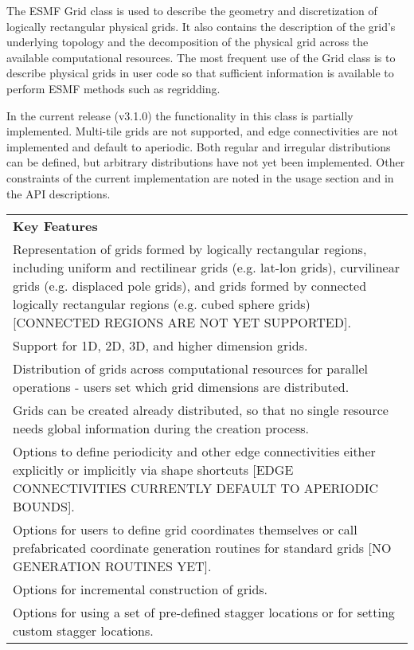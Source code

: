 %

The ESMF Grid class is used to describe the geometry and discretization
of logically rectangular physical grids.  It also contains the
description of the grid's underlying topology and the decomposition
of the physical grid across the available computational resources.
The most frequent use of the Grid class is to describe physical grids
in user code so that sufficient information is available to perform ESMF
methods such as regridding.  

In the current release (v3.1.0)
the functionality in this class is partially implemented.  
Multi-tile grids are not supported, and edge connectivities 
are not implemented and default to aperiodic.  Both regular and 
irregular distributions can be defined, but arbitrary
distributions have not yet been implemented.  
Other constraints of the current
implementation are noted in the usage section and in the API
descriptions.

\begin{center}
\begin{tabular}{|p{6in}|}
\hline
\vspace{.01in}
{\bf Key Features} \\[.01in]
Representation of grids formed by logically rectangular regions,
including uniform and rectilinear grids (e.g. lat-lon grids),
curvilinear grids (e.g. displaced pole grids), and grids formed
by connected logically rectangular regions (e.g. cubed sphere grids)
[CONNECTED REGIONS ARE NOT YET SUPPORTED].\\
Support for 1D, 2D, 3D, and higher dimension grids.\\ 
Distribution of grids across computational resources for parallel
operations - users set which grid dimensions are distributed.\\
Grids can be created already distributed, so that no single
resource needs global information during the creation process.\\
Options to define periodicity and other edge connectivities either 
explicitly or implicitly via shape shortcuts [EDGE CONNECTIVITIES
CURRENTLY DEFAULT TO APERIODIC BOUNDS].\\ 
Options for users to define grid coordinates themselves or call
prefabricated coordinate generation routines for standard grids
[NO GENERATION ROUTINES YET].\\
Options for incremental construction of grids.\\
Options for using a set of pre-defined stagger locations or for setting
custom stagger locations.\\ [.03in] \hline
\end{tabular}
\end{center}

